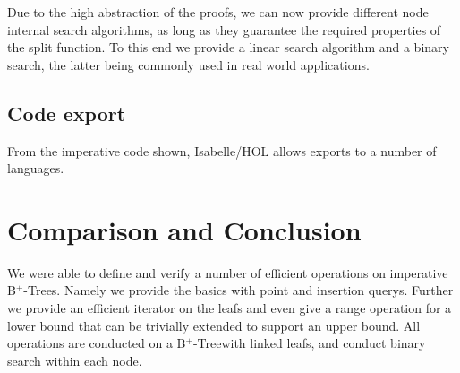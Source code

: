 \documentclass[a4paper,UKenglish,cleveref, autoref, thm-restate]{lipics-v2021}
\newcommand{\btree}{B$^+$-Tree}
\newcommand{\btrees}{B$^+$-Trees}
\begin{document}
Due to the high abstraction of the proofs,
we can now provide different node internal search algorithms,
as long as they guarantee the required properties of the split function.
To this end we provide a linear search algorithm
and a binary search, the latter being commonly used in real world applications.

\subsection{Code export}
\label{sec:code_export}

From the imperative code shown,
Isabelle/HOL allows exports to a number of languages.


\section{Comparison and Conclusion}
\label{sec:conclusion}

We were able to define and verify a number of efficient operations
on imperative \btrees.
Namely we provide the basics with point and insertion querys.
Further we provide an efficient iterator on the leafs
and even give a range operation for a lower bound that
can be trivially extended to support an upper bound.
All operations are conducted on a \btree with linked leafs,
and conduct binary search within each node.
\end{document}
